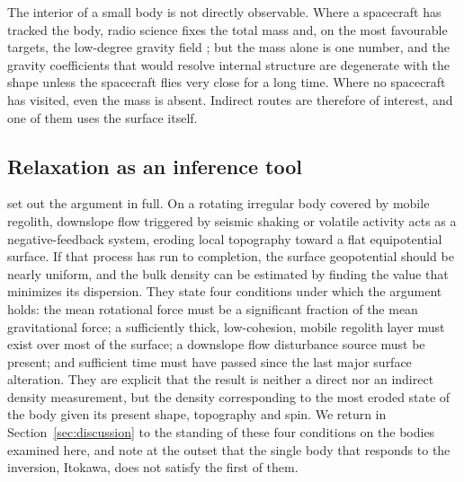 The interior of a small body is not directly observable. Where a
spacecraft has tracked the body, radio science fixes the total mass and,
on the most favourable targets, the low-degree gravity field
\citep{yeomans2000,patzold2016,scheeres2020}; but the mass alone is one
number, and the gravity coefficients that would resolve internal
structure are degenerate with the shape unless the spacecraft flies very
close for a long time. Where no spacecraft has visited, even the mass is
absent. Indirect routes are therefore of interest, and one of them uses
the surface itself.

\subsection{Relaxation as an inference tool}
\label{sec:intro:relaxation}

\citet{richardson2014} set out the argument in full. On a rotating
irregular body covered by mobile regolith, downslope flow triggered by
seismic shaking or volatile activity acts as a negative-feedback system,
eroding local topography toward a flat equipotential surface. If that
process has run to completion, the surface geopotential should be nearly
uniform, and the bulk density can be estimated by finding the value that
minimizes its dispersion. They state four conditions under which the
argument holds: the mean rotational force must be a significant fraction
of the mean gravitational force; a sufficiently thick, low-cohesion,
mobile regolith layer must exist over most of the surface; a downslope
flow disturbance source must be present; and sufficient time must have
passed since the last major surface alteration. They are explicit that
the result is neither a direct nor an indirect density measurement, but
the density corresponding to the most eroded state of the body given its
present shape, topography and spin. We return in
Section~\ref{sec:discussion} to the standing of these four conditions on
the bodies examined here, and note at the outset that the single body
that responds to the inversion, Itokawa, does not satisfy the first of
them.

